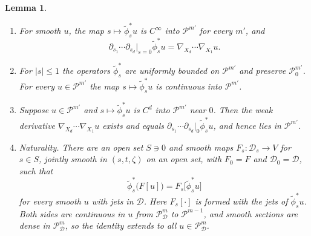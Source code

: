 \documentclass[11pt,reqno]{amsart}
\newtheorem{lemma}[theorem]{Lemma}
\theoremstyle{definition}
\theoremstyle{remark}
\newcommand{\Pp}{\mathcal{P}}
\newcommand{\Dom}{\mathcal{D}}
\newcommand{\abs}[1]{\lvert #1\rvert}
\newcommand{\lean}[1]{}
\newcommand{\uses}[1]{}
\numberwithin{equation}{section}
\begin{document}
\begin{lemma}\label{lem:flows}
\lean{ShortTime.HFlow.hpull, ShortTime.HFlow.contMDiffOn_hpullFib, ShortTime.HFlow.jointlySmoothOn_hpull, ShortTime.HFlow.hasDerivAt_hpull_zero, ShortTime.HFlow.hpull_hpull, ShortTime.HFlow.exists_jet_bound_hpull, ShortTime.HFlow.exists_jetTransport, ShortTime.HFlow.natFibreMap, ShortTime.HFlow.natFibreMap_F_zero, ShortTime.HFlow.hpull_nonlinFamily, ShortTime.HFlow.natParam, ShortTime.HFlow.hpull_fibreApply, ShortTime.HFlow.iterPull, ShortTime.HFlow.iterFM, ShortTime.HFlow.iterPull_nonlinFamily, ShortTime.HFlow.iterFlow_chart_patch, ShortTime.HFlow.exists_parabolicInner_hpull_le, ShortTime.HFlow.hpullExt, ShortTime.HFlow.hpullExt_mem_zeroAtStart, ShortTime.HFlow.contDiff_hpullExt_ofSmooth, ShortTime.HFlow.continuous_hpullExt_apply, ShortTime.HFlow.hpullExt_comp_timeDerivExt}
\uses{def:data, def:parabolic, fact:weak}
\begin{enumerate}[label=(\alph*),nosep]
\item For smooth $u$, the map $s\mapsto\tilde\phi_s^*u$ is $C^\infty$ into $\Pp^{m'}$ for every $m'$,
  and
  \[
    \partial_{s_1}\cdots\partial_{s_d}\big|_{s=0}\tilde\phi_s^*u=\nabla_{X_d}\cdots\nabla_{X_1}u .
  \]
\item For $\abs s\le1$ the operators $\tilde\phi_s^*$ are uniformly bounded on $\Pp^{m'}$ and preserve
  $\Pp^{m'}_0$. For every $u\in\Pp^{m'}$ the map $s\mapsto\tilde\phi_s^*u$ is continuous into
  $\Pp^{m'}$.
\item Suppose $u\in\Pp^{m'}$ and $s\mapsto\tilde\phi_s^*u$ is $C^d$ into $\Pp^{m'}$ near $0$. Then the
  weak derivative $\nabla_{X_d}\cdots\nabla_{X_1}u$ exists and equals
  $\partial_{s_1}\cdots\partial_{s_d}|_{0}\tilde\phi_s^*u$, and hence lies in $\Pp^{m'}$.
\item \emph{Naturality.} There are an open set $S\ni0$ and smooth maps $F_s\colon\Dom_s\to V$ for
  $s\in S$, jointly smooth in $(s,t,\zeta)$ on an open set, with $F_0=F$ and $\Dom_0=\Dom$, such that
  \[
    \tilde\phi_s^*\bigl(F[u]\bigr)=F_s\bigl[\tilde\phi_s^*u\bigr]
  \]
  for every smooth $u$ with jets in $\Dom$. Here $F_s[\cdot]$ is formed with the jets of
  $\tilde\phi_s^*u$. Both sides are continuous in $u$ from $\Pp^m_\Dom$ to $\Pp^{m-1}$, and smooth
  sections are dense in $\Pp^m_\Dom$, so the identity extends to all $u\in\Pp^m_\Dom$.
\end{enumerate}
\end{lemma}
\end{document}
